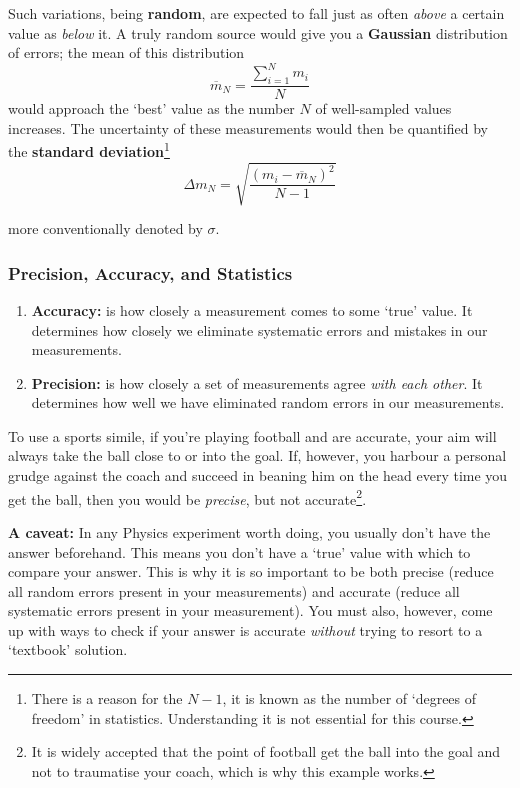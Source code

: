 Such variations, being \textbf{random}, are expected to fall just as often \textit{above} a certain value as \textit{below} it. A truly random source would give you a \textbf{Gaussian} distribution of errors; the mean of this distribution $$\overline{m}_N = \frac{\sum_{i=1}^{N}{m_i}}{N}$$ would approach the `best' value as the number $N$ of well-sampled values increases. The uncertainty of these measurements would then be quantified by the \textbf{standard deviation}\footnote{There is a reason for the $N-1$, it is known as the number of `degrees of freedom' in statistics. Understanding it is not essential for this course.} $$\Delta m_N = \sqrt{\frac{(m_i - \overline{m}_N)^2}{N-1}}$$

more conventionally denoted by $\sigma$.


\subsubsection{Precision, Accuracy, and Statistics}

\begin{enumerate}
    \item \textbf{Accuracy:} is how closely a measurement comes to some `true' value. It determines how closely we eliminate systematic errors and mistakes in our measurements.
    \item \textbf{Precision:} is how closely a set of measurements agree \textit{with each other}. It determines how well we have eliminated random errors in our measurements.
\end{enumerate}

To use a sports simile, if you're playing football and are accurate, your aim will always take the ball close to or into the goal. If, however, you harbour a personal grudge against the coach and succeed in beaning him on the head every time you get the ball, then you would be \textit{precise}, but not accurate\footnote{It is widely accepted that the point of football get the ball into the goal and not to traumatise your coach, which is why this example works.}.

\textbf{A caveat:} In any Physics experiment worth doing, you usually don't have the answer beforehand. This means you don't have a `true' value with which to compare your answer. This is why it is so important to be both precise (reduce all random errors present in your measurements) and accurate (reduce all systematic errors present in your measurement). You must also, however, come up with ways to check if your answer is accurate \textit{without} trying to resort to a `textbook' solution.

